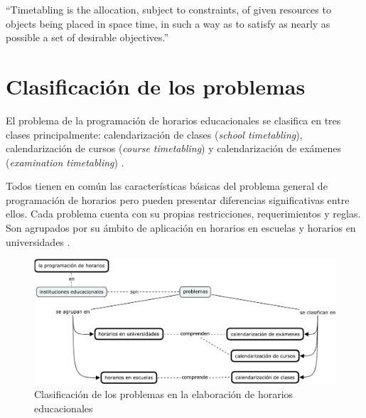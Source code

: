 \documentclass[draft,12pt,headsepline,footsepline,paper=letter]{scrreprt}
\begin{document}
“Timetabling is the allocation, subject to constraints, of given resources to objects being placed in space time, in such a way as to satisfy as nearly as possible a set of desirable objectives.”
\fi

\section{Clasificación de los problemas}
\label{sec:clasificacion_problemas}

El problema de la programación de horarios educacionales se clasifica en tres clases principalmente:
calendarización de clases (\textit{school timetabling}),
calendarización de cursos (\textit{course timetabling}) y
calendarización de exámenes (\textit{examination timetabling}) \citep[p.~88]{schaerf99a-survey-of-automated}.

Todos tienen en común las características básicas del problema general de programación de horarios pero pueden presentar diferencias significativas entre ellos. Cada problema cuenta con su propias restricciones, requerimientos y reglas. Son agrupados por su ámbito de aplicación en horarios en escuelas y horarios en universidades \citep[p.~10]{abdullah06heuristic-approaches}.

\begin{figure}[hbtp]
\centering
\includegraphics[width=\textwidth]{timetabling_classification.pdf}
\caption[Clasificación del problema]{Clasificación de los problemas en la elaboración de horarios educacionales}
\label{fig:timetabling_classification}
\end{figure}

\end{document}
